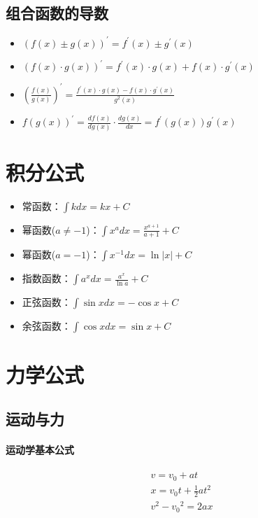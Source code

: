 \subsection{组合函数的导数}

\begin{itemize}
    \item $(f(x)\pm g(x))^\prime=f^\prime(x)\pm g^\prime(x)$
    \item $(f(x)\cdot g(x))^\prime=f^\prime(x)\cdot g(x)+f(x)\cdot g^\prime(x)$
    \item $(\frac{f(x)}{g(x)})^\prime=\frac{f^\prime(x)\cdot g(x)-f(x)\cdot g^\prime(x)}{g^2(x)}$
    \item $f(g(x))^\prime=\frac{df(x)}{dg(x)}\cdot\frac{dg(x)}{dx}=f^\prime(g(x))g^\prime(x)$
\end{itemize}

\section{积分公式}

\begin{itemize}
    \item 常函数：$\int kdx=kx+C$
    \item 幂函数($a\neq-1$)：$\int x^adx=\frac{x^{a+1}}{a+1}+C$
    \item 幂函数($a=-1$)：$\int x^{-1}dx=\ln|x|+C$
    \item 指数函数：$\int a^xdx=\frac{a^x}{\ln a}+C$
    \item 正弦函数：$\int\sin xdx=-\cos x+C$
    \item 余弦函数：$\int\cos xdx=\sin x+C$
\end{itemize}

\section{力学公式}

\subsection{运动与力}

\paragraph{运动学基本公式}
\begin{gather*}
    v=v_0+at\\
    x=v_0t+\frac{1}{2}at^2\\
    v^2-{v_0}^2=2ax
\end{gather*}

